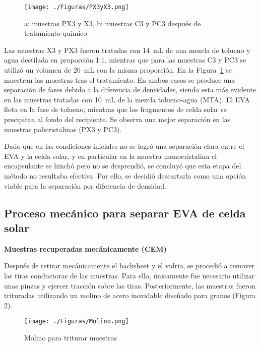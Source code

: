 \begin{figure}[htb]
	\begin{center}
		\texttt{[image: ./Figuras/PX3yX3.png]}
	\end{center}
	\vspace{-1em} %
	\caption{a: muestras PX3 y X3, b: muestras C3 y PC3 después de tratamiento químico}
	\label{fig:MuestrasPX3yX3}
\end{figure}

Las muestras X3 y PX3 fueron tratadas con 14~mL de una mezcla de tolueno y agua destilada en proporción 1:1, mientras que para las muestras C3 y PC3 se utilizó un volumen de 20~mL con la misma proporción. En la Figura~\ref{fig:MuestrasPX3yX3} se muestran las muestras tras el tratamiento. En ambos casos se produce una separación de fases debido a la diferencia de densidades, siendo esta más evidente en las muestras tratadas con 10~mL de la mezcla tolueno-agua (MTA). El EVA flota en la fase de tolueno, mientras que los fragmentos de celda solar se precipitan al fondo del recipiente. Se observa una mejor separación en las muestras policristalinas (PX3 y PC3). 

Dado que en las condiciones iniciales no se logró una separación clara entre el EVA y la celda solar, y en particular en la muestra monocristalina el encapsulante se hinchó pero no se desprendió, se concluyó que esta etapa del método no resultaba efectiva. Por ello, se decidió descartarla como una opción viable para la separación por diferencia de densidad.

\subsection{Proceso mecánico para separar EVA de celda solar}
\label{subsec:Resultados metodo mecanico celda}

\textbf{Muestras recuperadas mecánicamente (CEM)}

Después de retirar mecánicamente el backsheet y el vidrio, se procedió a remover las tiras conductoras de las muestras. Para ello, únicamente fue necesario utilizar unas pinzas y ejercer tracción sobre las tiras. Posteriormente, las muestras fueron trituradas utilizando un molino de acero inoxidable diseñado para granos (Figura \ref{fig:Molino}).   

\begin{figure}[htb]
	\begin{center}
		\texttt{[image: ./Figuras/Molino.png]}
	\end{center}
	\vspace{-1em} %
	\caption{Molino para triturar muestras}
	\label{fig:Molino}
\end{figure}

